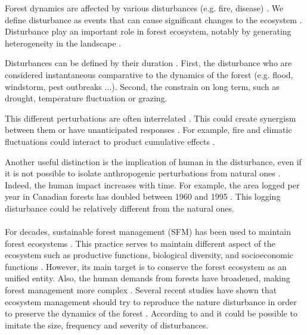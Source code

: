 \documentclass{article}
\begin{document}
Forest dynamics are affected by various disturbances (e.g. fire, disease) \citep{attiwill_disturbance_nodate}. We define disturbance as events that can cause significant changes to the ecosystem \citep{white1985natural, rykiel_towards_1985}. Disturbance play an important role in forest ecosystem, notably by generating heterogeneity in the landscape \citep{turner2010disturbance}.

Disturbances can be defined by their duration \citep{perera_simulation_2015}. First, the disturbance who are considered instantaneous comparative to the dynamics of the forest (e.g. flood, windstorm, pest outbreaks ...).
Second, the constrain on long term, such as drought, temperature fluctuation or grazing.


This different perturbations are often interrelated \citep{keane2015exploring}. This could create synergism between them \citep{mandre_environmental_2011} or have unanticipated responses \citep{perera_simulation_2015}. For example, fire and climatic fluctuations could interact to product cumulative effects \citep{romme_historical_2009}.

Another useful distinction is the implication of human in the disturbance, even if it is not possible to isolate anthropogenic perturbations from natural ones \citep{perera_simulation_2015}.
Indeed, the human impact increases with time. For example, the area logged per year in Canadian forests has doubled between 1960 and 1995 \citep{smith_canadas_2000}. This logging disturbance could be relatively different from the natural ones.


\paragraph{}
For decades, sustainable forest management (SFM) has been used to maintain forest ecosystems \citep{macdicken_global_2015}. 
This practice serves to maintain different aspect of the ecosystem such as productive functions, biological diversity, and socioeconomic functions \citep{makela_using_2012}. 
However, its main target is to conserve the forest ecosystem as an unified entity. %
Also, the human demands from forests have broadened, making forest management more complex \citep{eggers_balancing_2017}. Several recent studies have shown that ecosystem management should try to reproduce the nature disturbance in order to preserve the dynamics of the forest \citep{bengston_changing_1994, bengtsson_biodiversity_2000}. 
According to \cite{hunter1990wildlife} and \cite{hunter1988paleoecology} it could be possible to imitate the size, frequency and severity of disturbances.
\end{document}
